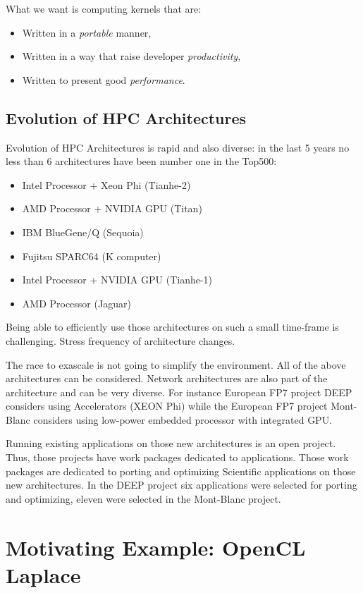 \documentclass[11pt, a4paper, twoside]{montblanc}
\begin{document}
What we want is computing kernels that are:
\begin{itemize}
\item Written in a \emph{portable} manner,
\item Written in a way that raise developer \emph{productivity},
\item Written to present good \emph{performance}.
\end{itemize}



  \subsection{Evolution of HPC Architectures}

Evolution of HPC Architectures is rapid and also diverse: in the last 5
years no less than 6 architectures have been number one in the Top500:
\begin{itemize}
\item Intel Processor + Xeon Phi (Tianhe-2)
\item AMD Processor + NVIDIA GPU (Titan)
\item IBM BlueGene/Q (Sequoia)
\item Fujitsu SPARC64 (K computer)
\item Intel Processor + NVIDIA GPU (Tianhe-1)
\item AMD Processor (Jaguar)
\end{itemize}
Being able to efficiently use those architectures on such a small
time-frame is challenging. Stress frequency of architecture changes.

The race to exascale is not going to simplify the environment. All of the above
architectures can be considered. Network architectures are also part of the
architecture and can be very diverse.  For instance European FP7 project DEEP
considers using Accelerators (XEON Phi) while the European FP7 project
Mont-Blanc considers using low-power embedded processor with integrated GPU.

Running existing applications on those new architectures is an open project.
Thus, those projects have work packages dedicated to applications. Those
work packages are dedicated to porting and optimizing Scientific applications on
those new architectures. In the DEEP project six applications were selected for
porting and optimizing, eleven were selected in the Mont-Blanc project.

\section{Motivating Example: OpenCL Laplace}
\end{document}
